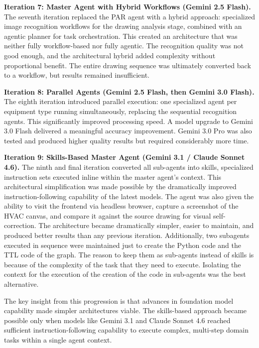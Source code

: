 \textbf{Iteration 7: Master Agent with Hybrid Workflows (Gemini 2.5 Flash).}
The seventh iteration replaced the PAR agent with a hybrid approach: specialized image
recognition workflows for the drawing analysis stage, combined with an agentic planner
for task orchestration. This created an architecture that was neither fully workflow-based
nor fully agentic. The recognition quality was not good enough, and the architectural
hybrid added complexity without proportional benefit. The entire drawing sequence was
ultimately converted back to a workflow, but results remained insufficient.

\textbf{Iteration 8: Parallel Agents (Gemini 2.5 Flash, then Gemini 3.0 Flash).}
The eighth iteration introduced parallel execution: one specialized agent per equipment
type running simultaneously, replacing the sequential recognition agents. This
significantly improved processing speed. A model upgrade to Gemini 3.0 Flash delivered
a meaningful accuracy improvement. Gemini 3.0 Pro was also tested and produced higher
quality results but required considerably more time.

\textbf{Iteration 9: Skills-Based Master Agent (Gemini 3.1 / Claude Sonnet 4.6).}
The ninth and final iteration converted all sub-agents into skills, specialized
instruction sets executed inline within the master agent's context. This architectural
simplification was made possible by the dramatically improved instruction-following
capability of the latest models. The agent was also given the ability to visit the
frontend via headless browser, capture a screenshot of the HVAC canvas, and compare
it against the source drawing for visual self-correction. The architecture became
dramatically simpler, easier to maintain, and produced better results than any previous
iteration. Additionally, two subagents executed in sequence were maintained 
just to create the Python code and the TTL code of the graph. The reason to keep them as 
sub-agents instead of skills is because of the complexity of the task that they need to execute. 
Isolating the context for the execution of the creation of the code in sub-agents was the best alternative. 

The key insight from this progression is that advances in foundation model capability made
simpler architectures viable. The skills-based approach became possible only when models
like Gemini 3.1 and Claude Sonnet 4.6 reached sufficient instruction-following capability
to execute complex, multi-step domain tasks within a single agent context.


